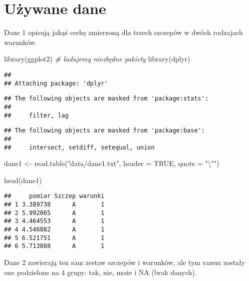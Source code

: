 \documentclass[
]{book}
\newenvironment{Shaded}{\begin{snugshade}}{\end{snugshade}}
\newcommand{\AttributeTok}[1]{\textcolor[rgb]{0.77,0.63,0.00}{#1}}
\newcommand{\CommentTok}[1]{\textcolor[rgb]{0.56,0.35,0.01}{\textit{#1}}}
\newcommand{\ConstantTok}[1]{\textcolor[rgb]{0.00,0.00,0.00}{#1}}
\newcommand{\FunctionTok}[1]{\textcolor[rgb]{0.00,0.00,0.00}{#1}}
\newcommand{\NormalTok}[1]{#1}
\newcommand{\OtherTok}[1]{\textcolor[rgb]{0.56,0.35,0.01}{#1}}
\newcommand{\SpecialCharTok}[1]{\textcolor[rgb]{0.00,0.00,0.00}{#1}}
\newcommand{\StringTok}[1]{\textcolor[rgb]{0.31,0.60,0.02}{#1}}
\begin{document}
\hypertarget{uux17cywane-dane}{%
\section{Używane dane}\label{uux17cywane-dane}}

Dane 1 opisują jakąś cechę zmierzoną dla trzech szczepów w dwóch rodzajach warunków.

\begin{Shaded}
\begin{Highlighting}[]
\FunctionTok{library}\NormalTok{(ggplot2) }\CommentTok{\# ładujemy niezbędne pakiety}
\FunctionTok{library}\NormalTok{(dplyr)}
\end{Highlighting}
\end{Shaded}

\begin{verbatim}
## 
## Attaching package: 'dplyr'
\end{verbatim}

\begin{verbatim}
## The following objects are masked from 'package:stats':
## 
##     filter, lag
\end{verbatim}

\begin{verbatim}
## The following objects are masked from 'package:base':
## 
##     intersect, setdiff, setequal, union
\end{verbatim}

\begin{Shaded}
\begin{Highlighting}[]
\NormalTok{dane1 }\OtherTok{\textless{}{-}} \FunctionTok{read.table}\NormalTok{(}\StringTok{"data/dane1.txt"}\NormalTok{, }\AttributeTok{header =} \ConstantTok{TRUE}\NormalTok{, }\AttributeTok{quote =} \StringTok{"}\SpecialCharTok{\textbackslash{}"}\StringTok{"}\NormalTok{)}

\FunctionTok{head}\NormalTok{(dane1)}
\end{Highlighting}
\end{Shaded}

\begin{verbatim}
##     pomiar Szczep warunki
## 1 3.389738      A       1
## 2 5.992065      A       1
## 3 4.464553      A       1
## 4 4.546082      A       1
## 5 6.521751      A       1
## 6 5.713088      A       1
\end{verbatim}

Dane 2 zawierają ten sam zestaw szczepów i warunków, ale tym razem zostały one podzielone na 4 grupy: tak, nie, może i NA (brak danych).
\end{document}
